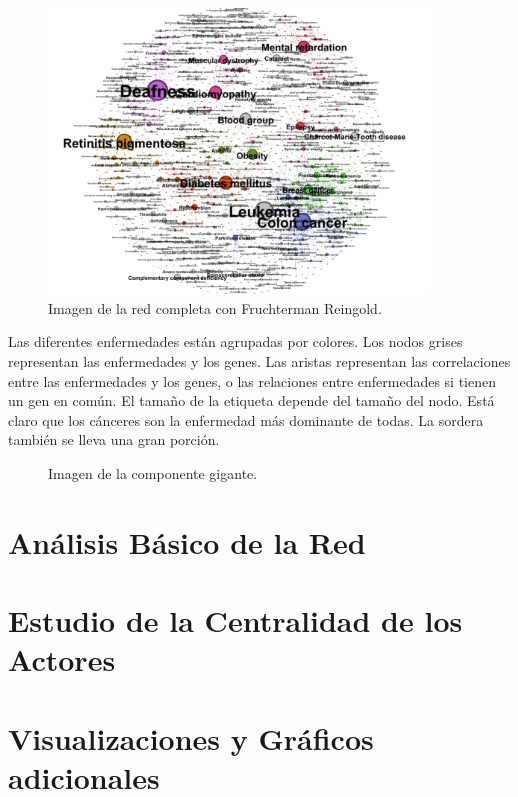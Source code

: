 \documentclass{uimppracticas}
\begin{document}
\begin{figure}[h]
	\centering
	\includegraphics[width=0.9\textwidth]{images/completa_FR_labels}
	\caption{Imagen de la red completa con Fruchterman Reingold.}
\end{figure}

Las diferentes enfermedades están agrupadas por colores. Los nodos grises representan las enfermedades y los genes. Las aristas representan las correlaciones entre las enfermedades y los genes, o las relaciones entre enfermedades si tienen un gen en común. El tamaño de la etiqueta depende del tamaño del nodo. Está claro que los cánceres son la enfermedad más dominante de todas. La sordera también se lleva una gran porción.

\begin{figure}[h]
	\centering
	\caption{Imagen de la componente gigante.}
\end{figure}

\section*{Análisis Básico de la Red}


\section*{Estudio de la Centralidad de los Actores}

\section*{Visualizaciones y Gráficos adicionales}

\newpage

\renewcommand{\refname}{Bibliografía}


\end{document}
